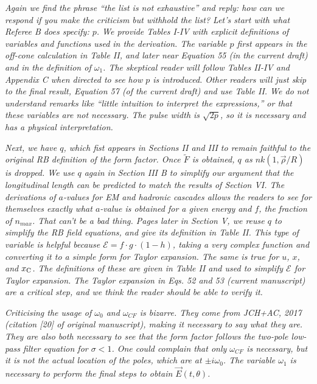 \documentclass[12pt]{article}
\begin{document}
\textit{Again we find the phrase ``the list is not exhaustive'' and reply: how can we respond if you make the criticism but withhold the list?  Let's start with what Referee B does specify: $p$.  We provide Tables I-IV with explicit definitions of variables and functions used in the derivation.  The variable $p$ first appears in the off-cone calculation in Table II, and later near Equation 55 (in the current draft) and in the definition of $\omega_1$.  The skeptical reader will follow Tables II-IV and Appendix C when directed to see how $p$ is introduced.  Other readers will just skip to the final result, Equation 57 (of the current draft) and use Table II.  We do not understand remarks like ``little intuition to interpret the expressions,'' or that these variables are not necessary.  The pulse width is $\sqrt{2p}$, so it is necessary and has a physical interpretation.}

\textit{Next, we have $q$, which fist appears in Sections II and III to remain faithful to the original RB definition of the form factor.  Once $\widetilde{F}$ is obtained, $q$ as $nk(1,\vec{\rho}/R)$ is dropped.  We use $q$ again in Section III B to simplify our argument that the longitudinal length can be predicted to match the results of Section VI.  The derivations of $a$-values for EM and hadronic cascades allows the readers to see for themselves exactly what $a$-value is obtained for a given energy and $f$, the fraction of $n_{max}$.  That can't be a bad thing.  Pages later in Section V, we reuse $q$ to simplify the RB field equations, and give its definition in Table II.  This type of variable is helpful because $\mathcal{E} = f \cdot g \cdot (1 - h)$, taking a very complex function and converting it to a simple form for Taylor expansion.  The same is true for $u$, $x$, and $x_{\rm C}$.  The definitions of these are given in Table II and used to simplify $\mathcal{E}$ for Taylor expansion.  The Taylor expansion in Eqs. 52 and 53 (current manuscript) are a critical step, and we think the reader should be able to verify it.}

\textit{Criticising the usage of $\omega_{0}$ and $\omega_{CF}$ is bizarre.  They come from JCH+AC, 2017 (citation [20] of original manuscript), making it necessary to say what they are.  They are also both necessary to see that the form factor follows the two-pole low-pass filter equation for $\sigma < 1$.  One could complain that only $\omega_{CF}$ is necessary, but it is not the actual location of the poles, which are at $\pm i \omega_{0}$.  The variable $\omega_1$ is necessary to perform the final steps to obtain $\vec{E}(t,\theta)$.}
\end{document}
